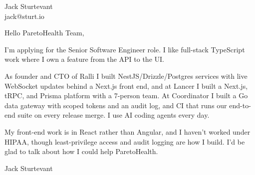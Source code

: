 \documentclass[11pt]{article}
\begin{document}
\raggedright

{\namefont\fontsize{20pt}{24pt}\selectfont Jack Sturtevant}\\[-0.3em]
jack@sturt.io

\vspace{1.2em}

Hello ParetoHealth Team,

I'm applying for the Senior Software Engineer role. I like full-stack TypeScript work where I own a feature from the API to the UI.

As founder and CTO of Ralli I built NestJS/Drizzle/Postgres services with live WebSocket updates behind a Next.js front end, and at Lancer I built a Next.js, tRPC, and Prisma platform with a 7-person team. At Coordinator I built a Go data gateway with scoped tokens and an audit log, and CI that runs our end-to-end suite on every release merge. I use AI coding agents every day.

My front-end work is in React rather than Angular, and I haven't worked under HIPAA, though least-privilege access and audit logging are how I build. I'd be glad to talk about how I could help ParetoHealth.

\vspace{0.6em}
Jack Sturtevant
\end{document}
